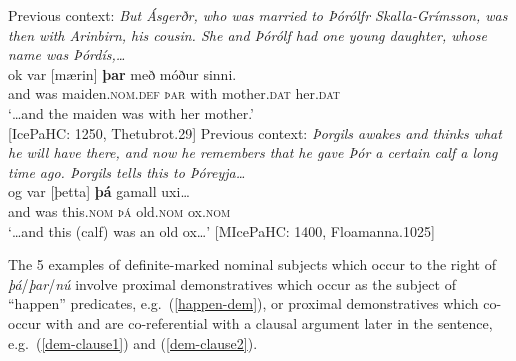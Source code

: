 \documentclass[output=paper,colorlinks,citecolor=brown]{langscibook}
\begin{document}
\ea \label{def-subj-fam-top}
\ea
Previous context: \textit{But Ásgerðr, who was married to Þórólfr Skalla-Grímsson, was then with Arinbirn, his cousin. She and Þórólf had one young daughter, whose name was Þórdís,\dots}\\
\gll {\dots}ok var [mærin] \textbf{þar} með móður sinni.\\
and was maiden.\textsc{nom.def} \textsc{þar} with mother.\textsc{dat} her.\textsc{dat}\\
\glt `{\dots}and the maiden was with her mother.'\\ \hfill [IcePaHC: 1250, Thetubrot.29]
\ex
Previous context: \textit{Þorgils awakes and thinks what he will have there, and now he remembers that he gave Þór a certain calf a long time ago. Þorgils tells this to Þóreyja\dots}\\
\gll  {\dots}og var [þetta] \textbf{þá} gamall uxi\dots \\
and was this.\textsc{nom} \textsc{þá} old.\textsc{nom} ox.\textsc{nom}\\
\glt `{\dots}and this (calf) was an old ox\dots' \hfill [MIcePaHC: 1400, Floamanna.1025]
\z 
\z

The 5 examples of definite-marked nominal subjects which occur to the right of \textit{þá}/\textit{þar}/\textit{nú} 
involve proximal demonstratives which occur as the subject of ``happen'' predicates, e.g.~(\ref{happen-dem}), or proximal demonstratives which co-occur with and are co-referential with a clausal argument later in the sentence, e.g.~(\ref{dem-clause1}) and (\ref{dem-clause2}). 
\end{document}

